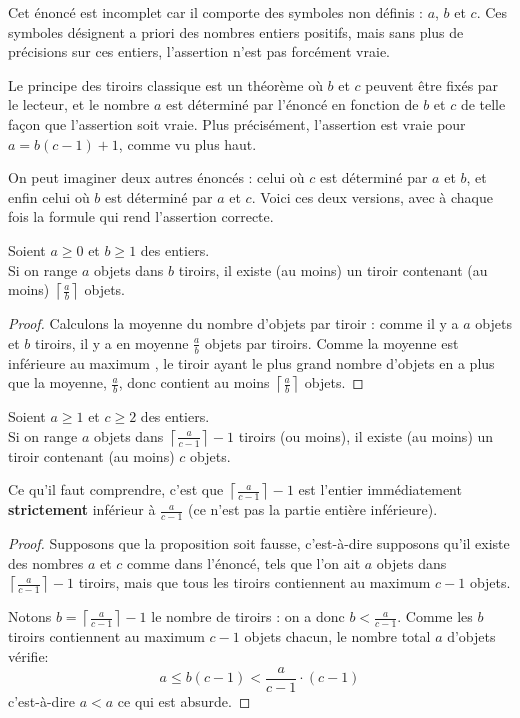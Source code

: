 Cet énoncé est incomplet car il comporte des symboles non définis : $a$, $b$ et $c$. Ces symboles désignent a priori des nombres entiers positifs, mais sans plus de précisions sur ces entiers, l'assertion n'est pas forcément vraie.

Le principe des tiroirs classique est un théorème où $b$ et $c$ peuvent être fixés par le lecteur, et le nombre $a$ est déterminé par l'énoncé en fonction de $b$ et $c$ de telle façon que l'assertion soit vraie. Plus précisément, l'assertion est vraie pour $a = b(c-1)+1$, comme vu plus haut.

On peut imaginer deux autres énoncés  : celui où $c$ est déterminé par $a$ et $b$, et enfin celui où $b$ est déterminé par $a$ et $c$. Voici ces deux versions, avec à chaque fois la formule qui rend l'assertion correcte.

\begin{proposition}\label{tiroirs_c}Soient $a\geq 0$ et $b\geq 1$ des entiers.\\
Si on range $a$ objets dans $b$ tiroirs, il existe (au moins) un tiroir contenant (au moins) $\left\lceil \frac{a}{b} \right\rceil$ objets.
\end{proposition}

\begin{proof} Calculons la moyenne du nombre d'objets par tiroir : comme il y a $a$ objets et $b$ tiroirs, il y a en moyenne $\frac{a}{b}$ objets par tiroirs. Comme \og la moyenne est inférieure au maximum \fg, le tiroir ayant le plus grand nombre d'objets en a plus que la moyenne, $\frac{a}{b}$, donc contient au moins $\left\lceil \frac{a}{b} \right\rceil$ objets.
\end{proof}






\begin{proposition}\label{tiroirs_b}
Soient $a\geq 1$ et $c\geq 2$ des entiers.\\
Si on range $a$ objets dans $\left\lceil \frac{a}{c-1} \right\rceil-1$ tiroirs (ou moins), il existe (au moins) un tiroir contenant (au moins) $c$ objets.
\end{proposition}

Ce qu'il faut comprendre, c'est que $\left\lceil \frac{a}{c-1} \right\rceil-1$ est l'entier immédiatement \textbf{strictement} inférieur à $\frac{a}{c-1}$ (ce n'est pas la partie entière inférieure).

\begin{proof} Supposons que la proposition soit fausse, c'est-à-dire supposons qu'il existe des nombres $a$ et $c$ comme dans l'énoncé, tels que l'on ait $a$ objets dans $\left\lceil \frac{a}{c-1} \right\rceil-1$ tiroirs, mais que tous les tiroirs contiennent au maximum $c-1$ objets.

Notons $b=\left\lceil \frac{a}{c-1} \right\rceil-1$ le nombre de tiroirs : on a donc $b < \frac{a}{c-1}$. Comme les $b$ tiroirs contiennent au maximum $c-1$ objets chacun, le nombre total $a$ d'objets vérifie:
\[ a\leq  b(c-1) < \frac{a}{c-1}\cdot (c-1)
\]
c'est-à-dire  $a < a$ ce qui est absurde.
\end{proof}


